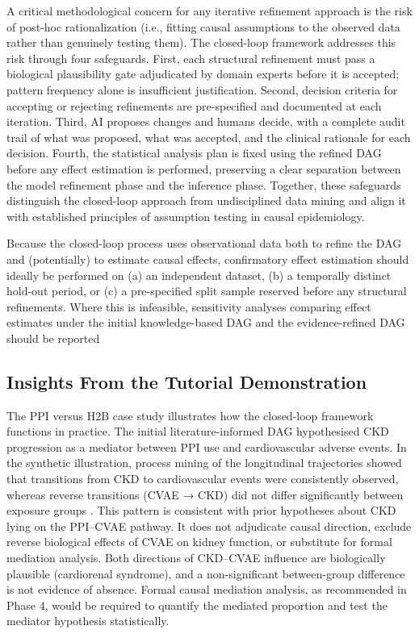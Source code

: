 \documentclass[sn-vancouver-num]{sn-jnl}
\begin{document}
A critical methodological concern for any iterative refinement approach is the risk of post-hoc rationalization (i.e., fitting causal assumptions to the observed data rather than genuinely testing them). The closed-loop framework addresses this risk through four safeguards. First, each structural refinement must pass a biological plausibility gate adjudicated by domain experts before it is accepted; pattern frequency alone is insufficient justification. Second, decision criteria for accepting or rejecting refinements are pre-specified and documented at each iteration. Third, AI proposes changes and humans decide, with a complete audit trail of what was proposed, what was accepted, and the clinical rationale for each decision. Fourth, the statistical analysis plan is fixed using the refined DAG before any effect estimation is performed, preserving a clear separation between the model refinement phase and the inference phase. Together, these safeguards distinguish the closed-loop approach from undisciplined data mining and align it with established principles of assumption testing in causal epidemiology. 

Because the closed-loop process uses observational data both to refine the DAG and (potentially) to estimate causal effects, confirmatory effect estimation should ideally be performed on (a) an independent dataset, (b) a temporally distinct hold-out period, or (c) a pre-specified split sample reserved before any structural refinements. Where this is infeasible, sensitivity analyses comparing effect estimates under the initial knowledge-based DAG and the evidence-refined DAG should be reported 

\subsection{Insights From the Tutorial Demonstration}

The PPI versus H2B case study illustrates how the closed-loop framework functions in practice. The initial literature-informed DAG hypothesised CKD progression as a mediator between PPI use and cardiovascular adverse events. In the synthetic illustration, process mining of the longitudinal trajectories showed that transitions from CKD to cardiovascular events were consistently observed, whereas reverse transitions (CVAE → CKD) did not differ significantly between exposure groups \citep{chen2025}. This pattern is consistent with prior hypotheses about CKD lying on the PPI–CVAE pathway. It does not adjudicate causal direction, exclude reverse biological effects of CVAE on kidney function, or substitute for formal mediation analysis. Both directions of CKD–CVAE influence are biologically plausible (cardiorenal syndrome), and a non-significant between-group difference is not evidence of absence. Formal causal mediation analysis, as recommended in Phase 4, would be required to quantify the mediated proportion and test the mediator hypothesis statistically.
\end{document}
